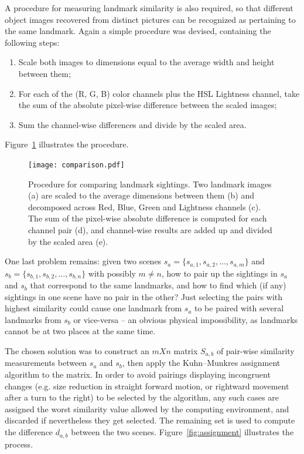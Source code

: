 \documentclass[twocolumn, 9pt]{jsproceedings}
\begin{document}
A procedure for measuring landmark similarity is also required, so that different object images recovered from distinct pictures can be recognized as pertaining to the same landmark. Again a simple procedure was devised, containing the following steps:

\begin{enumerate}
\item Scale both images to dimensions equal to the average width and height between them;
\item For each of the (R, G, B) color channels plus the HSL Lightness channel, take the sum of the absolute pixel-wise difference between the scaled images;
\item Sum the channel-wise differences and divide by the scaled area.
\end{enumerate}

Figure~\ref{fig:comparison} illustrates the procedure.

\begin{figure}[h!]
\texttt{[image: comparison.pdf]}
\caption{Procedure for comparing landmark sightings. Two landmark images (a) are scaled to the average dimensions between them (b) and decomposed across Red, Blue, Green and Lightness channels (c). The sum of the pixel-wise absolute difference is computed for each channel pair (d), and channel-wise results are added up and divided by the scaled area (e).}
\label{fig:comparison}
\end{figure}

One last problem remains: given two scenes \(s_a = \{s_{a,1}, s_{a,2}, \dotsc, s_{a,m}\}\) and \(s_b = \{s_{b,1}, s_{b,2}, \dotsc, s_{b,n}\}\) with possibly \(m \neq n\), how to pair up the sightings in \(s_a\) and \(s_b\) that correspond to the same landmarks, and how to find which (if any) sightings in one scene have no pair in the other? Just selecting the pairs with highest similarity could cause one landmark from \(s_a\) to be paired with several landmarks from \(s_b\) or vice-versa -- an obvious physical impossibility, as landmarks cannot be at two places at the same time.

The chosen solution was to construct an \(m X n\) matrix \(S_{a,b}\) of pair-wise similarity measurements between \(s_a\) and \(s_b\), then apply the Kuhn–Munkres assignment algorithm to the matrix. In order to avoid pairings displaying incongruent changes (e.g. size reduction in straight forward motion, or rightward movement after a turn to the right) to be selected by the algorithm, any such cases are assigned the worst similarity value allowed by the computing environment, and discarded if nevertheless they get selected. The remaining set is used to compute the difference \(d_{a,b}\) between the two scenes. Figure~\ref{fig:assignment} illustrates the process.
\end{document}
